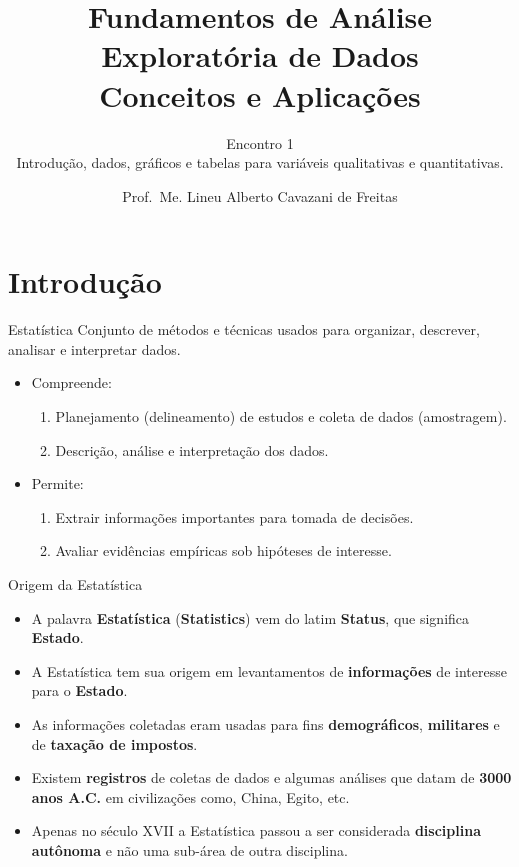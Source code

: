 \documentclass[
  ignorenonframetext,
  serif,
  professionalfont,
  usenames,
  dvipsnames,
  aspectratio = 169]{beamer}
\title{\hfill\break
\textbf{Fundamentos de Análise Exploratória de Dados}\\
Conceitos e Aplicações}
\subtitle{\hfill\break
Encontro 1\\
Introdução, dados, gráficos e tabelas para variáveis qualitativas e
quantitativas.}
\author{Prof.~Me. Lineu Alberto Cavazani de Freitas \vspace{-0.5cm}}
\date{}
\providecommand{\tightlist}{%
  \setlength{\itemsep}{0pt}\setlength{\parskip}{0pt}}
\renewcommand{\tightlist}{%
  \setlength{\itemsep}{0\baselineskip}
  \setlength{\parskip}{0.25\baselineskip}
}
\def\beginAHalfColumn{\begin{minipage}{0.49\textwidth}}%
\def\endColumns{\end{minipage}}%
\begin{document}
\frame{\titlepage}

\section{Introdução}\label{introduuxe7uxe3o}

\begin{frame}{}
\label{section}
\begin{block}{Estatística}
\label{estatuxedstica}
Conjunto de métodos e técnicas usados para organizar, descrever,
analisar e interpretar dados.
\end{block}

\beginAHalfColumn

\begin{itemize}
\tightlist
\item
  Compreende:

  \begin{enumerate}
  \tightlist
  \item
    Planejamento (delineamento) de estudos e coleta de dados
    (amostragem).
  \item
    Descrição, análise e interpretação dos dados.
  \end{enumerate}
\end{itemize}

\endColumns
\beginAHalfColumn

\begin{itemize}
\tightlist
\item
  Permite:

  \begin{enumerate}
  \tightlist
  \item
    Extrair informações importantes para tomada de decisões.
  \item
    Avaliar evidências empíricas sob hipóteses de interesse.
  \end{enumerate}
\end{itemize}

\endColumns
\end{frame}

\begin{frame}{Origem da Estatística}
\label{origem-da-estatuxedstica}
\begin{itemize}
\item
  A palavra \textbf{Estatística} (\textbf{Statistics}) vem do latim
  \textbf{Status}, que significa \textbf{Estado}.
\item
  A Estatística tem sua origem em levantamentos de \textbf{informações}
  de interesse para o \textbf{Estado}.
\item
  As informações coletadas eram usadas para fins \textbf{demográficos},
  \textbf{militares} e de \textbf{taxação de impostos}.
\item
  Existem \textbf{registros} de coletas de dados e algumas análises que
  datam de \textbf{3000 anos A.C.} em civilizações como, China, Egito,
  etc.
\item
  Apenas no século XVII a Estatística passou a ser considerada
  \textbf{disciplina autônoma} e não uma sub-área de outra disciplina.
\end{itemize}
\end{frame}
\end{document}
